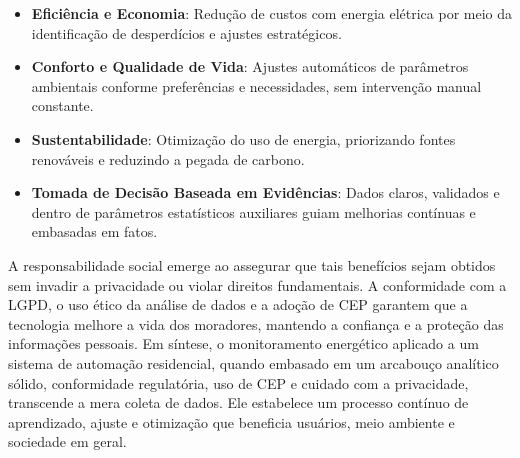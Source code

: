 \begin{itemize}
    \item \textbf{Eficiência e Economia}: Redução de custos com energia elétrica por meio da identificação de desperdícios e ajustes estratégicos.
    \item \textbf{Conforto e Qualidade de Vida}: Ajustes automáticos de parâmetros ambientais conforme preferências e necessidades, sem intervenção manual constante.
    \item \textbf{Sustentabilidade}: Otimização do uso de energia, priorizando fontes renováveis e reduzindo a pegada de carbono.
    \item \textbf{Tomada de Decisão Baseada em Evidências}: Dados claros, validados e dentro de parâmetros estatísticos auxiliares guiam melhorias contínuas e embasadas em fatos.
\end{itemize}

A responsabilidade social emerge ao assegurar que tais benefícios sejam obtidos sem invadir a privacidade ou violar direitos fundamentais. A conformidade com a LGPD, o uso ético da análise de dados e a adoção de CEP garantem que a tecnologia melhore a vida dos moradores, mantendo a confiança e a proteção das informações pessoais.
Em síntese, o monitoramento energético aplicado a um sistema de automação residencial, quando embasado em um arcabouço analítico sólido, conformidade regulatória, uso de CEP e cuidado com a privacidade, transcende a mera coleta de dados. Ele estabelece um processo contínuo de aprendizado, ajuste e otimização que beneficia usuários, meio ambiente e sociedade em geral.  
